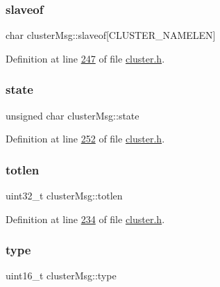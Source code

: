 \subsubsection{\texorpdfstring{slaveof}{slaveof}}
{\footnotesize\ttfamily char cluster\+Msg\+::slaveof\mbox{[}C\+L\+U\+S\+T\+E\+R\+\_\+\+N\+A\+M\+E\+L\+EN\mbox{]}}



Definition at line \hyperlink{cluster_8h_source_l00247}{247} of file \hyperlink{cluster_8h_source}{cluster.\+h}.

\mbox{\label{structclusterMsg_a5cdfa214f48e21eb3ab2447acf18bc84}} 
\subsubsection{\texorpdfstring{state}{state}}
{\footnotesize\ttfamily unsigned char cluster\+Msg\+::state}



Definition at line \hyperlink{cluster_8h_source_l00252}{252} of file \hyperlink{cluster_8h_source}{cluster.\+h}.

\mbox{\label{structclusterMsg_a5ef56726841594a3d31e8d1f9db9cdc8}} 
\subsubsection{\texorpdfstring{totlen}{totlen}}
{\footnotesize\ttfamily uint32\+\_\+t cluster\+Msg\+::totlen}



Definition at line \hyperlink{cluster_8h_source_l00234}{234} of file \hyperlink{cluster_8h_source}{cluster.\+h}.

\mbox{\label{structclusterMsg_a06118df79b802adc033967b7d42ddd8c}} 
\subsubsection{\texorpdfstring{type}{type}}
{\footnotesize\ttfamily uint16\+\_\+t cluster\+Msg\+::type}



